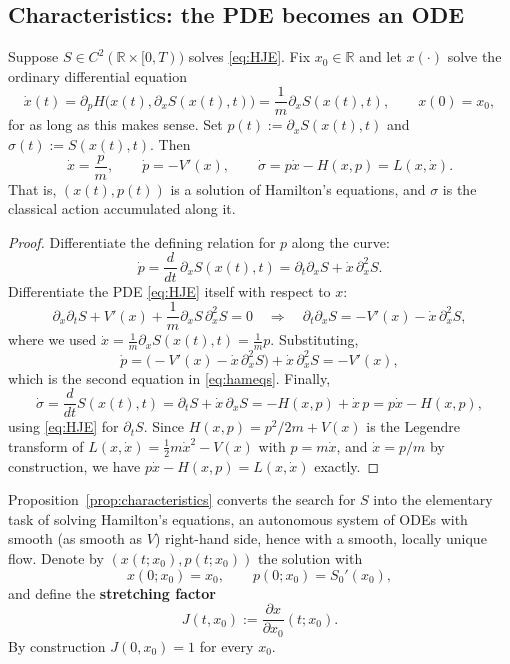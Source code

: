\subsection{Characteristics: the PDE becomes an ODE}
\label{sec:characteristics}

\begin{proposition}
\label{prop:characteristics}
Suppose $S\in C^2(\mathbb{R}\times[0,T))$ solves \eqref{eq:HJE}. Fix
    $x_0\in\mathbb{R}$ and let $x(\cdot)$ solve the ordinary differential
    equation
\[
\dot x(t) = \partial_pH\big(x(t),\partial_xS(x(t),t)\big) =
    \frac{1}{m}\partial_xS(x(t),t), \qquad x(0)=x_0,
\]
for as long as this makes sense. Set $p(t):=\partial_xS(x(t),t)$ 
    and $\sigma(t):=S(x(t),t)$. Then
\begin{equation}
\dot x = \frac{p}{m}, \qquad \dot p = -V'(x), 
    \qquad \dot\sigma = p\dot x - H(x,p) = L(x,\dot x).
\label{eq:hameqs}
\end{equation}
That is, $(x(t),p(t))$ is a solution of Hamilton's equations, and $\sigma$ is
    the classical action accumulated along it.
\end{proposition}

\begin{proof}
Differentiate the defining relation for $p$ along the curve:
\[
\dot p = \frac{d}{dt}\,\partial_xS(x(t),t) = \partial_t\partial_xS +
    \dot x\,\partial_x^2 S.
\]
Differentiate the PDE \eqref{eq:HJE} itself with respect to $x$:
\[
\partial_x\partial_tS + V'(x) + \frac{1}{m}\partial_xS\,\partial_x^2S = 0
\quad\Longrightarrow\quad
\partial_t\partial_xS = -V'(x) - \dot x\,\partial_x^2S,
\]
where we used $\dot x = \frac1m\partial_xS(x(t),t)=\frac1m p$. Substituting,
\[
\dot p = \big(-V'(x)-\dot x\,\partial_x^2S\big) + \dot x\,\partial_x^2S = -V'(x),
\]
which is the second equation in \eqref{eq:hameqs}. Finally,
\[
\dot\sigma = \frac{d}{dt}S(x(t),t) = \partial_tS + \dot x\,\partial_xS = -H(x,p) + \dot x\,p = p\dot x - H(x,p),
\]
using \eqref{eq:HJE} for $\partial_tS$. Since $H(x,p)=p^2/2m+V(x)$ is the Legendre transform of $L(x,\dot x)=\tfrac12m\dot x^2-V(x)$ with $p=m\dot x$, and $\dot x=p/m$ by construction, we have $p\dot x-H(x,p)=L(x,\dot x)$ exactly.
\end{proof}

Proposition~\ref{prop:characteristics} converts the search for $S$ into the
elementary task of solving Hamilton's equations, an autonomous system of ODEs
with smooth (as smooth as $V$) right-hand side, hence with a smooth, locally
unique flow. Denote by $(x(t;x_0),p(t;x_0))$ the solution with
\[
x(0;x_0)=x_0, \qquad p(0;x_0)=S_0'(x_0),
\]
and define the \textbf{stretching factor}
\begin{equation}
J(t,x_0) := \frac{\partial x}{\partial x_0}(t;x_0).
\label{eq:Jdef}
\end{equation}
By construction $J(0,x_0)=1$ for every $x_0$.

